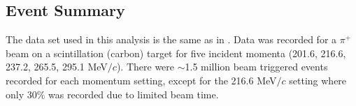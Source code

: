 \subsection{Event Summary}
The data set used in this analysis is the same as in \cite{duet}. Data was recorded for a $\pi^{+}$ beam on a scintillation (carbon) target for five incident momenta (201.6, 216.6, 237.2, 265.5, 295.1 MeV$/c$). There were $\sim$1.5 million beam triggered events recorded for each momentum setting, except for the 216.6 MeV$/c$ setting where only 30\% was recorded due to limited beam time.
